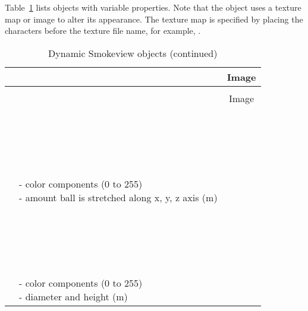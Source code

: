 Table~\ref{tab:devices_dynamic} lists objects with variable properties. Note that the  object uses a texture map or image to alter its appearance. The texture map is specified by placing the characters  before the texture file name, for example, .

\begin{longtable}[ht]{|l|l|c|}
\caption{Dynamic Smokeview objects}
\label{tab:devices_dynamic}
\\ \hline
\ct{SMOKEVIEW_ID}  & \ct{SMOKEVIEW_PARAMETERS} & Image  \\ \hline \hline
\endfirsthead
\caption{Dynamic Smokeview objects (continued)}
\\ \hline
\ct{SMOKEVIEW_ID}  & \ct{SMOKEVIEW_PARAMETERS} & Image  \\ \hline \hline
\endhead

\ct{ball} &
\parbox[c]{\boxwidth}{
\hspace{1in} \\
\\
\\
\\  \\
 - color components (0 to 255) \\
 - amount ball is stretched along x, y, z axis (m) \\
\hspace{1in} } &
 \\ \hline

 &
\parbox[c]{\boxwidth}{
\hspace{1in} \\
\\
\\
\\ \\
 - color components (0 to 255) \\
 - diameter and height (m) \\
\hspace{1in}
} &
 \\ \hline


\end{longtable}
